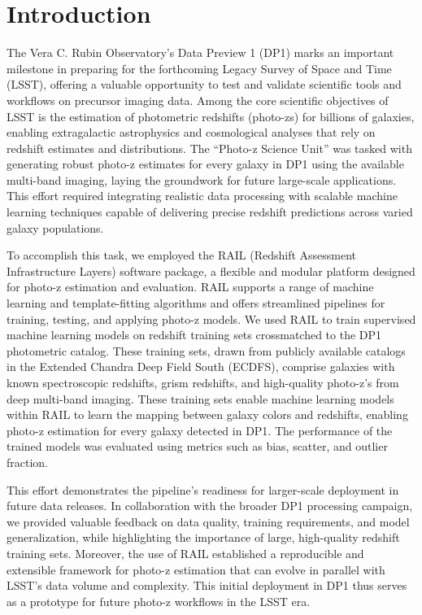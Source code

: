 \section{Introduction}
\label{sec:intro:0}

The Vera C. Rubin Observatory’s Data Preview 1 (DP1) marks an important milestone in preparing for the forthcoming Legacy Survey of Space and Time (LSST), offering a valuable opportunity to test and validate scientific tools and workflows on precursor imaging data. Among the core scientific objectives of LSST is the estimation of photometric redshifts (photo-zs) for billions of galaxies, enabling extragalactic astrophysics and cosmological analyses that rely on redshift estimates and distributions. The ``Photo-z Science Unit'' was tasked with generating robust photo-z estimates for every galaxy in DP1 using the available multi-band imaging, laying the groundwork for future large-scale applications. This effort required integrating realistic data processing with scalable machine learning techniques capable of delivering precise redshift predictions across varied galaxy populations.

To accomplish this task, we employed the RAIL (Redshift Assessment Infrastructure Layers) software package, a flexible and modular platform designed for photo-z estimation and evaluation. RAIL supports a range of machine learning and template-fitting algorithms and offers streamlined pipelines for training, testing, and applying photo-z models.
We used RAIL to train supervised machine learning models on redshift training sets crossmatched to the DP1 photometric catalog. These training sets, drawn from publicly available catalogs in the Extended Chandra Deep Field South (ECDFS), comprise galaxies with known spectroscopic redshifts, grism redshifts, and high-quality photo-z's from deep multi-band imaging. These training sets enable machine learning models within RAIL to learn the mapping between galaxy colors and redshifts, enabling photo-z estimation for every galaxy detected in DP1. The performance of the trained models was evaluated using metrics such as bias, scatter, and outlier fraction.

This effort demonstrates the pipeline's readiness for larger-scale deployment in future data releases. In collaboration with the broader DP1 processing campaign, we provided valuable feedback on data quality, training requirements, and model generalization, while highlighting the importance of large, high-quality redshift training sets. Moreover, the use of RAIL established a reproducible and extensible framework for photo-z estimation that can evolve in parallel with LSST’s data volume and complexity. This initial deployment in DP1 thus serves as a prototype for future photo-z workflows in the LSST era.

